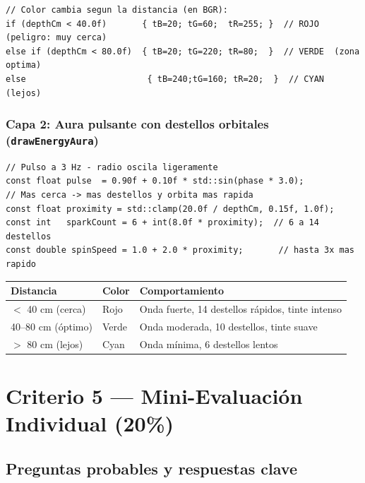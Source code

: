 \documentclass[11pt,a4paper]{article}
\begin{document}
\begin{lstlisting}[caption={Color del tinte reactivo a la distancia}]
// Color cambia segun la distancia (en BGR):
if (depthCm < 40.0f)       { tB=20; tG=60;  tR=255; }  // ROJO   (peligro: muy cerca)
else if (depthCm < 80.0f)  { tB=20; tG=220; tR=80;  }  // VERDE  (zona optima)
else                        { tB=240;tG=160; tR=20;  }  // CYAN   (lejos)
\end{lstlisting}

\subsubsection*{Capa 2: Aura pulsante con destellos orbitales (\texttt{drawEnergyAura})}

\begin{lstlisting}[caption={Pulso y velocidad de destellos reactivos a Z}]
// Pulso a 3 Hz - radio oscila ligeramente
const float pulse  = 0.90f + 0.10f * std::sin(phase * 3.0);
// Mas cerca -> mas destellos y orbita mas rapida
const float proximity = std::clamp(20.0f / depthCm, 0.15f, 1.0f);
const int   sparkCount = 6 + int(8.0f * proximity);  // 6 a 14 destellos
const double spinSpeed = 1.0 + 2.0 * proximity;       // hasta 3x mas rapido
\end{lstlisting}

\begin{center}
\begin{tabular}{lll}
\toprule
\textbf{Distancia} & \textbf{Color} & \textbf{Comportamiento} \\
\midrule
$<$ 40 cm (cerca)   & Rojo  & Onda fuerte, 14 destellos rápidos, tinte intenso \\
40–80 cm (óptimo)   & Verde & Onda moderada, 10 destellos, tinte suave \\
$>$ 80 cm (lejos)   & Cyan  & Onda mínima, 6 destellos lentos \\
\bottomrule
\end{tabular}
\end{center}

\section{Criterio 5 — Mini-Evaluación Individual (20\%)}

\subsection*{Preguntas probables y respuestas clave}
\end{document}
